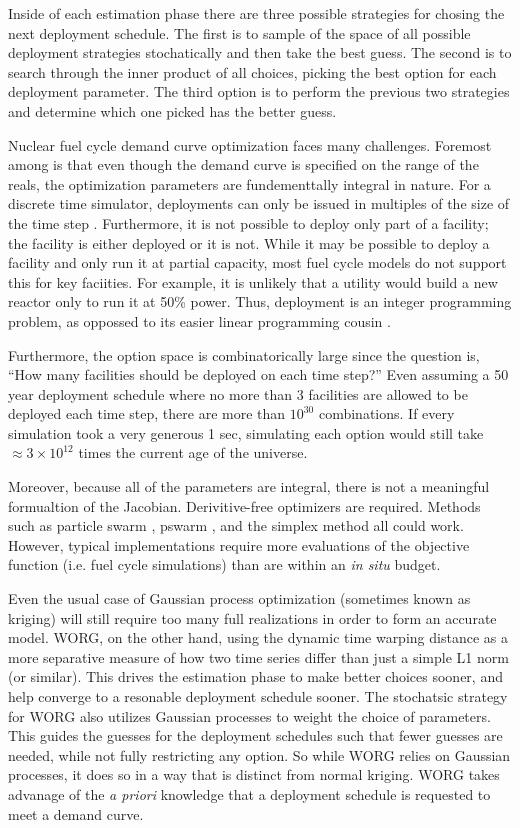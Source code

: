 Inside of each estimation phase there are three possible strategies for 
chosing the next deployment schedule.  The first is to sample of the 
space of all possible deployment strategies stochatically and then take the 
best guess.  The second is to search through the inner product of all choices,
picking the best option for each deployment parameter. The third option 
is to perform the previous two strategies and determine which one picked
has the better guess.

Nuclear fuel cycle demand curve optimization faces many challenges. 
Foremost among is that even though the demand curve is specified on the 
range of the reals, the optimization parameters are fundementtally 
integral in nature. For a discrete time simulator, deployments can only 
be issued in multiples of the size of the time step \citeme. Furthermore, 
it is not possible to deploy only part of a facility; the facility is either 
deployed or it is not. While it may be possible to deploy a facility and 
only run it at partial capacity, most fuel cycle models do not support this
for key faciities.  For example, it is unlikely that a utility would build 
a new reactor only to run it at 50\% power. Thus, deployment is an integer 
programming problem, as oppossed to its easier linear programming cousin
\citeme.

Furthermore, the option space is combinatorically large since the 
question is, ``How many facilities should be deployed on each time step?'' 
Even assuming a 50 year deployment schedule where no more than 3 facilities 
are allowed to be deployed each time step, there are more than $10^30$ 
combinations. If every simulation took a very generous 1 sec, simulating 
each option would still take $\approx 3\times10^12$ times the current age
of the universe.

Moreover, because all of the parameters are integral, there is not a 
meaningful formualtion of the Jacobian. Derivitive-free optimizers are 
required. Methods such as particle swarm \citeme, pswarm \citeme, and the 
simplex method all could work.  However, typical implementations require
more evaluations of the objective function (i.e. fuel cycle simulations)
than are within an \emph{in situ} budget. 

Even the usual case of 
Gaussian process optimization (sometimes known as kriging) will still 
require too many full realizations in order to form an accurate model.
WORG, on the other hand, using the dynamic time warping distance as a 
more separative measure of how two time series differ than just a simple
L1 norm (or similar). This drives the estimation phase to make better choices
sooner, and help converge to a resonable deployment schedule sooner. 
The stochatsic strategy for WORG also utilizes Gaussian processes to 
weight the choice of parameters.  This guides the guesses for the deployment
schedules such that fewer guesses are needed, while not fully restricting 
any option.  So while WORG relies on Gaussian processes, it does so in a way
that is distinct from normal kriging. WORG
takes advanage of the \emph{a priori} knowledge that a deployment 
schedule is requested to meet a demand curve. 

